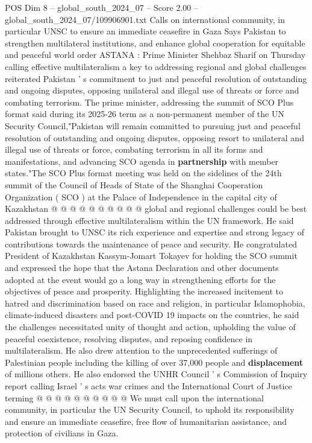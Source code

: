 \begin{textsample}{POS Dim 8 – global\_south\_2024\_07 – Score 2.00 – global\_south\_2024\_07/109906901.txt}  \label{ex:f8_pos_340}
Calls on international community, in particular UNSC to ensure an immediate ceasefire in Gaza Says Pakistan to strengthen multilateral institutions, and enhance global cooperation for equitable and peaceful world order ASTANA : Prime Minister Shehbaz Sharif on Thursday calling effective multilateralism a key to addressing regional and global challenges reiterated Pakistan ' s commitment to just and peaceful resolution of outstanding and ongoing disputes, opposing unilateral and illegal use of threats or force and combating terrorism.
The prime minister, addressing the summit of SCO Plus format said during its 2025-26 term as a non-permanent member of the UN Security Council,"Pakistan will remain committed to pursuing just and peaceful resolution of outstanding and ongoing disputes, opposing resort to unilateral and illegal use of threats or force, combating terrorism in all its forms and manifestations, and advancing SCO agenda in \textbf{partnership} with member states."The SCO Plus format meeting was held on the sidelines of the 24th summit of the Council of Heads of State of the Shanghai Cooperation Organization ( SCO ) at the Palace of Independence in the capital city of Kazakhstan @ @ @ @ @ @ @ @ @ @ global and regional challenges could be best addressed through effective multilateralism within the UN framework.
He said Pakistan brought to UNSC its rich experience and expertise and strong legacy of contributions towards the maintenance of peace and security.
He congratulated President of Kazakhstan Kassym-Jomart Tokayev for holding the SCO summit and expressed the hope that the Astana Declaration and other documents adopted at the event would go a long way in strengthening efforts for the objectives of peace and prosperity.
Highlighting the increased incitement to hatred and discrimination based on race and religion, in particular Islamophobia, climate-induced disasters and post-COVID 19 impacts on the countries, he said the challenges necessitated unity of thought and action, upholding the value of peaceful coexistence, resolving disputes, and reposing confidence in multilateralism.
He also drew attention to the unprecedented sufferings of Palestinian people including the killing of over 37,000 people and \textbf{displacement} of millions others.
He also endorsed the UNHR Council ' s Commission of Inquiry report calling Israel ' s acts war crimes and the International Court of Justice terming @ @ @ @ @ @ @ @ @ @ We must call upon the international community, in particular the UN Security Council, to uphold its responsibility and ensure an immediate ceasefire, free flow of humanitarian assistance, and protection of civilians in Gaza.

\end{textsample}
